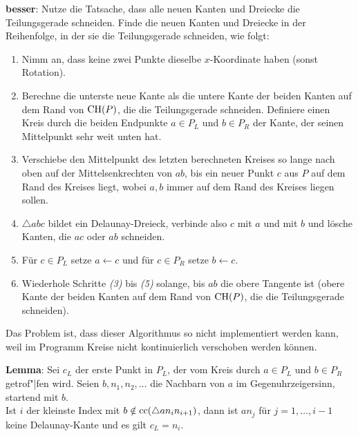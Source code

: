 \textbf{besser}:
Nutze die Tatsache, dass alle neuen Kanten und Dreiecke die Teilungsgerade schneiden.
Finde die neuen Kanten und Dreiecke in der Reihenfolge, in der sie die Teilungsgerade schneiden,
wie folgt:
\begin{enumerate}
    \item
    Nimm an, dass keine zwei Punkte dieselbe $x$-Koordinate haben
    (sonst Rotation).
    
    \item
    Berechne die unterste neue Kante als die untere Kante der beiden Kanten auf dem Rand von
    $\operatorname{CH}(P)$, die die Teilungsgerade schneiden.
    Definiere einen Kreis durch die beiden Endpunkte $a \in P_L$ und $b \in P_R$ der Kante,
    der seinen Mittelpunkt sehr weit unten hat.
    
    \item
    Verschiebe den Mittelpunkt des letzten berechneten Kreises
    so lange nach oben auf der Mittelsenkrechten von $ab$,
    bis ein neuer Punkt $c$ aus $P$ auf dem Rand des Kreises liegt,
    wobei $a, b$ immer auf dem Rand des Kreises liegen sollen.
    
    \item
    $\triangle abc$ bildet ein Delaunay-Dreieck,
    verbinde also $c$ mit $a$ und mit $b$ und lösche Kanten, die $ac$ oder $ab$ schneiden.
    
    \item
    Für $c \in P_L$ setze $a \leftarrow c$ und für $c \in P_R$ setze $b \leftarrow c$.
    
    \item
    Wiederhole Schritte \emph{(3)} bis \emph{(5)} solange, bis $ab$ die obere Tangente ist
    (obere Kante der beiden Kanten auf dem Rand von $\operatorname{CH}(P)$, die die Teilungsgerade schneiden).
\end{enumerate}

Das Problem ist, dass dieser Algorithmus so nicht implementiert werden kann,
weil im Programm Kreise nicht kontinuierlich verschoben werden können.

\linie
\pagebreak

\textbf{Lemma}:
Sei $c_L$ der erste Punkt in $P_L$, der vom Kreis durch $a \in P_L$ und $b \in P_R$ getrof"|fen
wird.
Seien $b, n_1, n_2, \dotsc$ die Nachbarn von $a$ im Gegenuhrzeigersinn, startend mit $b$.\\
Ist $i$ der kleinste Index mit $b \notin \operatorname{cc}(\triangle a n_i n_{i+1})$,
dann ist $an_j$ für $j = 1, \dotsc, i - 1$ keine Delaunay-Kante und es gilt $c_L = n_i$.

